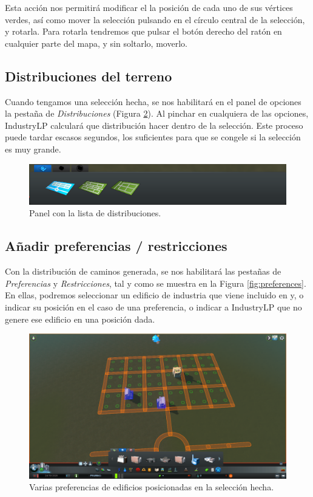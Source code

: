 Esta acción nos permitirá modificar el la posición de cada uno de sus vértices verdes, así como mover la selección pulsando en el círculo central de la selección, y rotarla. Para rotarla tendremos que pulsar el botón derecho del ratón en cualquier parte del mapa, y sin soltarlo, moverlo.

\subsection{Distribuciones del terreno}

Cuando tengamos una selección hecha, se nos habilitará en el panel de opciones la pestaña de \textit{Distribuciones} (Figura \ref{fig:distributions-panel}). Al pinchar en cualquiera de las opciones, IndustryLP calculará que distribución hacer dentro de la selección. Este proceso puede tardar escasos segundos, los suficientes para que \cities se congele si la selección es muy grande.

\begin{figure}[h]
	\centering
	\includegraphics[width=\textwidth]{images/distributions}
	\caption{Panel con la lista de distribuciones.}
	\label{fig:distributions-panel}
\end{figure}

\subsection{Añadir preferencias / restricciones}

Con la distribución de caminos generada, se nos habilitará las pestañas de \textit{Preferencias} y \textit{Restricciones}, tal y como se muestra en la Figura \ref{fig:preferences}. En ellas, podremos seleccionar un edificio de industria que viene incluido en \cities y, o indicar su posición en el caso de una preferencia, o indicar a IndustryLP que no genere ese edificio en una posición dada. \\

\begin{figure}[h]
	\centering
	\includegraphics[width=\textwidth]{images/preferences}
	\caption{Varias preferencias de edificios posicionadas en la selección hecha.}
	\label{fig:distributions-panel}
\end{figure}

